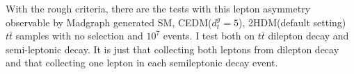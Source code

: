 			With the rough criteria, there are the tests with this lepton asymmetry observable by Madgraph generated SM, CEDM($d_t^g = 5$), 2HDM(default setting) $t\bar{t}$ samples with no selection and $10^7$ events. I test both on $t\bar{t}$ dilepton decay and semi-leptonic decay. It is just that collecting both leptons from dilepton decay and that collecting one lepton in each semileptonic decay event. 

			\begin{figure}[H]
			\centering
			    \\
			\end{figure}
